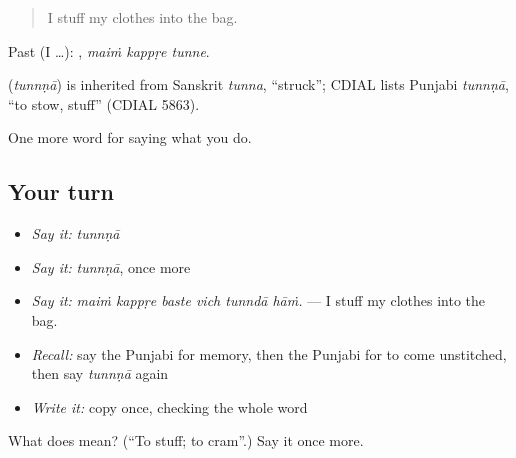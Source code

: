 \begin{quote}
I stuff my clothes into the bag.
\end{quote}

Past (I …):   , \emph{maiṁ kappṛe tunne}.

\begin{cousinweb}
\textbf{} (\emph{tunnṇā}) is inherited from Sanskrit \emph{tunna}, \textquotedblleft{}struck\textquotedblright{}; CDIAL lists Punjabi \emph{tunnṇā}, \textquotedblleft{}to stow, stuff\textquotedblright{} (CDIAL 5863).
\end{cousinweb}

\begin{grammarlens}[title={What you've built}]
One more word for saying what you do.
\end{grammarlens}

\subsection*{Your turn}
\begin{itemize}
\raggedright
  \item \emph{Say it:} \emph{tunnṇā}
  \item \emph{Say it:} \emph{tunnṇā}, once more
  \item \emph{Say it:} \emph{maiṁ kappṛe baste vich tunndā hāṁ.} — I stuff my clothes into the bag.
  \item \emph{Recall:} say the Punjabi for memory, then the Punjabi for to come unstitched, then say \emph{tunnṇā} again
  \item \emph{Write it:} copy \textbf{} once, checking the whole word
\end{itemize}

\begin{tcolorbox}[breakable,colback=teal!4,colframe=teal!35!black,title={Before you move on}]
What does  mean? (\textquotedblleft{}To stuff; to cram\textquotedblright{}.) Say it once more.
\end{tcolorbox}

